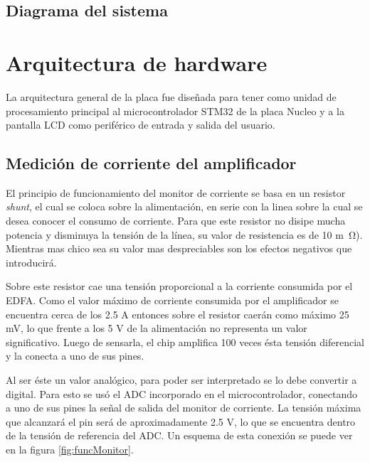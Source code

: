 \subsection{Diagrama del sistema}



\section{Arquitectura de hardware}

La arquitectura general de la placa fue diseñada para tener como unidad de procesamiento principal al microcontrolador STM32 de la placa Nucleo y a la pantalla LCD como periférico de entrada y salida del usuario.

\subsection{Medición de corriente del amplificador}

El principio de funcionamiento del monitor de corriente se basa en un resistor \textit{shunt}, el cual se coloca sobre la alimentación, en serie con la linea sobre la cual se desea conocer el consumo de corriente. Para que este resistor no disipe mucha potencia y disminuya la tensión de la línea, su valor de resistencia es de 10 \si{m\ohm}). Mientras mas chico sea su valor mas despreciables son los efectos negativos que introducirá.

Sobre este resistor cae una tensión proporcional a la corriente consumida por el EDFA. Como el valor máximo de corriente consumida por el amplificador se encuentra cerca de los 2.5 A entonces sobre el resistor caerán como máximo 25 mV, lo que frente a los 5 V de la alimentación no representa un valor significativo. Luego de sensarla, el chip amplifica 100 veces ésta tensión diferencial y la conecta a uno de sus pines.

Al ser éste un valor analógico, para poder ser interpretado se lo debe convertir a digital. Para esto se usó el ADC incorporado en el microcontrolador, conectando a uno de sus pines la señal de salida del monitor de corriente. La tensión máxima que alcanzará el pin será de aproximadamente 2.5 V, lo que se encuentra dentro de la tensión de referencia del ADC. Un esquema de esta conexión se puede ver en la figura \ref{fig:funcMonitor}.

